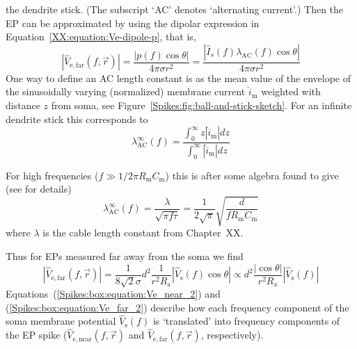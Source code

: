 the dendrite stick. (The subscript `AC' denotes `alternating current'.)
Then the EP can be approximated by using the 
dipolar expression in Equation~\ref{XX:equation:Ve-dipole-p}, that is,
\begin{equation}
  |\hat{V}_\mathrm{e,far}(f,\vec{r})| =  \frac{|p(f) \cos \theta|}{4 \pi \sigma r^2} 
                                            = \frac{| \hat{I}_{s}(f) \lambda_\mathrm{AC}(f) \cos \theta|}{4 \pi \sigma r^2}   
                                                                                        \label{Spikes:box:equation:Ve_far_1}
\end{equation}
One way to define an AC length constant is as the mean value of the 
envelope of the sinusoidally varying (normalized) membrane current
$\hat{i}_\mathrm{m}$ weighted with distance $z$ from soma, 
see Figure~\ref{Spikes:fig:ball-and-stick-sketch}. 
For an infinite dendrite stick this corresponds to
%
\begin{equation}
  \lambda_\mathrm{AC}^\infty(f) = \frac{\int_0^\infty z |\hat{i}_\mathrm{m}| dz}{\int_0^\infty |\hat{i}_\mathrm{m}| dz} 
\nonumber
\end{equation}
%

For high frequencies ($f \gg 1/2 \pi R_\mathrm{m} C_\mathrm{m}$) this is after some algebra 
found to give (see \citet[Appendix C]{Pettersen2008} for details)
%
\begin{equation}
 \lambda_\mathrm{AC}^\infty(f) =  \frac{\lambda}{\sqrt{\pi f \tau}} = 
  \frac{1}{2\sqrt{\pi}} \sqrt{\frac{d}{f R_\mathrm{m} C_\mathrm{m}}}
\label{Spikes:box:equation:approx_lambda_ac}
\end{equation}
%
where $\lambda$ is the cable length constant from 
Chapter~XX. 

%
Thus for EPs measured far away from the soma we find 
%  
\begin{equation}
  |\hat{V}_\mathrm{e,far}(f,\vec{r})|  = \frac{1}{8 \sqrt{2} \sigma} d^{2} \frac{1}{r^2  R_\mathrm{a}} 
      |\hat{V}_\mathrm{s}(f) \cos \theta | 
  \propto d^{2} \frac{|\cos \theta|}{r^2  R_\mathrm{a}} |\hat{V}_\mathrm{s}(f)| 
  \label{Spikes:box:equation:Ve_far_2}
\end{equation}
%
Equations~(\ref{Spikes:box:equation:Ve_near_2}) and (\ref{Spikes:box:equation:Ve_far_2}) describe how each frequency component of 
the soma membrane potential  $\hat{V}_\mathrm{s}(f)$ is `translated' into frequency components of the 
EP spike ($\hat{V}_\mathrm{e,near}(f,\vec{r})$ and $\hat{V}_\mathrm{e,far}(f,\vec{r})$, respectively). 



